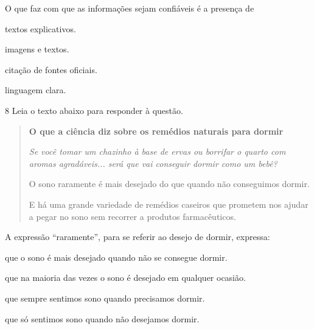 
O que faz com que as
informações sejam confiáveis é a presença de

\begin{escolha}
    
    \item textos explicativos.
    
    \item imagens e textos.
    
    \item citação de fontes oficiais.
    
    \item linguagem clara.

\end{escolha}

\num{8} Leia o texto abaixo para responder à questão. 

\begin{quote}

\textbf{O que a ciência diz sobre os remédios naturais para dormir}

\textit{Se você tomar um chazinho à base de ervas ou borrifar o quarto com
aromas agradáveis... será que vai conseguir dormir como um bebê?}

O sono raramente é mais desejado do que quando não conseguimos dormir.

E há uma grande variedade de remédios caseiros que prometem nos ajudar a
pegar no sono sem recorrer a produtos farmacêuticos.

\end{quote}


A expressão ``raramente'', para se referir ao desejo de dormir, expressa:

\begin{escolha}
  
  \item que o sono é mais desejado quando não se consegue dormir.
  
  \item que na maioria das vezes o sono é desejado em qualquer ocasião.
  
  \item que sempre sentimos sono quando precisamos dormir.
  
  \item que só sentimos sono quando não desejamos dormir. 

\end{escolha}

